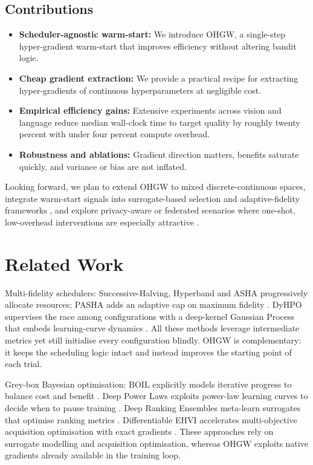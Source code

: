 \documentclass{article}
\begin{document}
\subsection{Contributions}
\begin{itemize}
  \item \textbf{Scheduler-agnostic warm-start:} We introduce OHGW, a single-step hyper-gradient warm-start that improves efficiency without altering bandit logic.
  \item \textbf{Cheap gradient extraction:} We provide a practical recipe for extracting hyper-gradients of continuous hyperparameters at negligible cost.
  \item \textbf{Empirical efficiency gains:} Extensive experiments across vision and language reduce median wall-clock time to target quality by roughly twenty percent with under four percent compute overhead.
  \item \textbf{Robustness and ablations:} Gradient direction matters, benefits saturate quickly, and variance or bias are not inflated.
\end{itemize}

Looking forward, we plan to extend OHGW to mixed discrete-continuous spaces, integrate warm-start signals into surrogate-based selection \cite{khazi-2023-deep} and adaptive-fidelity frameworks \cite{jiang-2024-efficient}, and explore privacy-aware or federated scenarios where one-shot, low-overhead interventions are especially attractive \cite{panda-2022-new,khodak-2021-federated}.

\section{Related Work}
Multi-fidelity schedulers: Successive-Halving, Hyperband and ASHA progressively allocate resources; PASHA adds an adaptive cap on maximum fidelity \cite{bohdal-2022-pasha}. DyHPO supervises the race among configurations with a deep-kernel Gaussian Process that embeds learning-curve dynamics \cite{wistuba-2022-supervising}. All these methods leverage intermediate metrics yet still initialise every configuration blindly. OHGW is complementary: it keeps the scheduling logic intact and instead improves the starting point of each trial.

Grey-box Bayesian optimisation: BOIL explicitly models iterative progress to balance cost and benefit \cite{nguyen-2019-bayesian}. Deep Power Laws exploits power-law learning curves to decide when to pause training \cite{kadra-2023-scaling}. Deep Ranking Ensembles meta-learn surrogates that optimise ranking metrics \cite{khazi-2023-deep}. Differentiable EHVI accelerates multi-objective acquisition optimisation with exact gradients \cite{daulton-2020-differentiable}. These approaches rely on surrogate modelling and acquisition optimisation, whereas OHGW exploits native gradients already available in the training loop.
\end{document}
